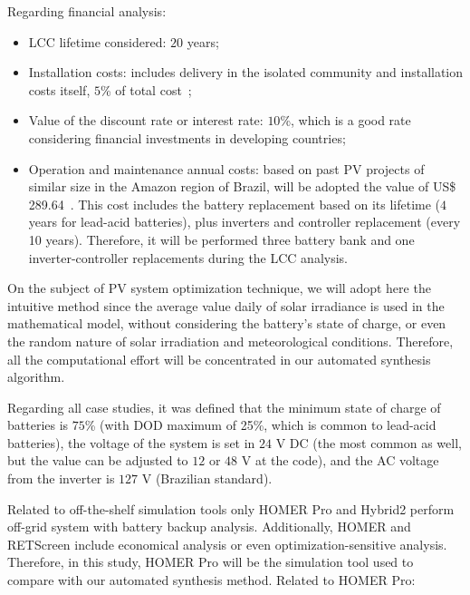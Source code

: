 \documentclass[review]{elsarticle}
\begin{document}
Regarding financial analysis:
\begin{itemize}
	\item LCC lifetime considered: $20$ years;
	\item Installation costs: includes delivery in the isolated community and installation costs itself, $5$\% of total cost~\cite{Agrener2013};
	\item Value of the discount rate or interest rate: $10$\%, which is a good rate considering financial investments in developing countries;
	\item Operation and maintenance annual costs: based on past PV projects of similar size in the Amazon region of Brazil, will be adopted the value of US\$ 289.64~\citep{Agrener2013}. This cost includes the battery replacement based on its lifetime ($4$ years for lead-acid batteries), plus inverters and controller replacement (every 10 years). Therefore, it will be performed three battery bank and one inverter-controller replacements during the LCC analysis.
\end{itemize}

On the subject of PV system optimization technique, we will adopt here the intuitive method 
since the average value daily of solar irradiance is used in the mathematical model, 
without considering the battery's state of charge, or even the random nature 
of solar irradiation and meteorological conditions. Therefore, all the computational 
effort will be concentrated in our automated synthesis algorithm.

Regarding all case studies, it was defined that the minimum state of charge of batteries is $75$\% (with DOD maximum of 25\%, which is common to lead-acid batteries), the voltage of the system is set in $24$ V DC (the most common as well, but the value can be adjusted to $12$ or $48$ V at the code), and the AC voltage from the inverter is $127$ V (Brazilian standard).

Related to off-the-shelf simulation tools only HOMER Pro and Hybrid2 perform off-grid system with battery backup analysis. Additionally, HOMER and RETScreen include economical analysis or even optimization-sensitive analysis. Therefore, in this study, HOMER Pro will be the simulation tool used to compare with our automated synthesis method.  Related to HOMER Pro:
\end{document}
